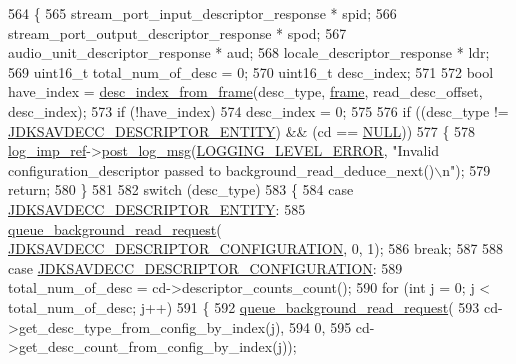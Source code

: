 \begin{DoxyCode}
564 \{
565     stream\_port\_input\_descriptor\_response * spid;
566     stream\_port\_output\_descriptor\_response * spod;
567     audio\_unit\_descriptor\_response * aud;
568     locale\_descriptor\_response * ldr;
569     uint16\_t total\_num\_of\_desc = 0;
570     uint16\_t desc\_index;
571 
572     \textcolor{keywordtype}{bool} have\_index = \hyperlink{classavdecc__lib_1_1end__station__imp_aa169d9cd63c3e8d588717a7a6f132fde}{desc\_index\_from\_frame}(desc\_type, 
      \hyperlink{gst__avb__playbin_8c_ac8e710e0b5e994c0545d75d69868c6f0}{frame}, read\_desc\_offset, desc\_index);
573     \textcolor{keywordflow}{if} (!have\_index)
574         desc\_index = 0;
575 
576     \textcolor{keywordflow}{if} ((desc\_type != \hyperlink{group__descriptor_gaf06b7a0bf808dc8e3104511947d694c4}{JDKSAVDECC\_DESCRIPTOR\_ENTITY}) && (cd == 
      \hyperlink{openavb__types__base__pub_8h_a070d2ce7b6bb7e5c05602aa8c308d0c4}{NULL}))
577     \{
578         \hyperlink{namespaceavdecc__lib_acbe3e2a96ae6524943ca532c87a28529}{log\_imp\_ref}->\hyperlink{classavdecc__lib_1_1log_a68139a6297697e4ccebf36ccfd02e44a}{post\_log\_msg}(\hyperlink{namespaceavdecc__lib_a501055c431e6872ef46f252ad13f85cdaf2c4481208273451a6f5c7bb9770ec8a}{LOGGING\_LEVEL\_ERROR}, \textcolor{stringliteral}{"Invalid
       configuration\_descriptor passed to background\_read\_deduce\_next()\(\backslash\)n"});
579         \textcolor{keywordflow}{return};
580     \}
581 
582     \textcolor{keywordflow}{switch} (desc\_type)
583     \{
584     \textcolor{keywordflow}{case} \hyperlink{group__descriptor_gaf06b7a0bf808dc8e3104511947d694c4}{JDKSAVDECC\_DESCRIPTOR\_ENTITY}:
585         \hyperlink{classavdecc__lib_1_1end__station__imp_a5dcbf7253fe2b67afcc2c41cc9afe826}{queue\_background\_read\_request}(
      \hyperlink{group__descriptor_ga645687847f92dc28bcb37a7c334cb875}{JDKSAVDECC\_DESCRIPTOR\_CONFIGURATION}, 0, 1);
586         \textcolor{keywordflow}{break};
587 
588     \textcolor{keywordflow}{case} \hyperlink{group__descriptor_ga645687847f92dc28bcb37a7c334cb875}{JDKSAVDECC\_DESCRIPTOR\_CONFIGURATION}:
589         total\_num\_of\_desc = cd->descriptor\_counts\_count();
590         \textcolor{keywordflow}{for} (\textcolor{keywordtype}{int} j = 0; j < total\_num\_of\_desc; j++)
591         \{
592             \hyperlink{classavdecc__lib_1_1end__station__imp_a5dcbf7253fe2b67afcc2c41cc9afe826}{queue\_background\_read\_request}(
593                 cd->get\_desc\_type\_from\_config\_by\_index(j),
594                 0,
595                 cd->get\_desc\_count\_from\_config\_by\_index(j));

\end{DoxyCode}
